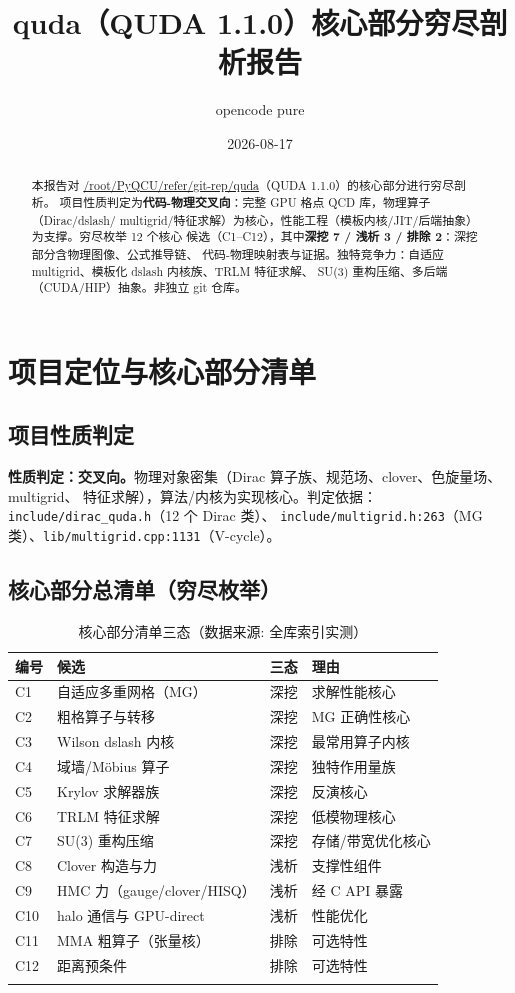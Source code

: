 \documentclass[UTF8]{ctexart}
\title{quda（QUDA 1.1.0）核心部分穷尽剖析报告}
\author{opencode pure}
\date{2026-08-17}
\begin{document}
\maketitle

\begin{abstract}
本报告对 \url{/root/PyQCU/refer/git-rep/quda}（QUDA 1.1.0）的核心部分进行穷尽剖析。
项目性质判定为\textbf{代码-物理交叉向}：完整 GPU 格点 QCD 库，物理算子（Dirac/dslash/
multigrid/特征求解）为核心，性能工程（模板内核/JIT/后端抽象）为支撑。穷尽枚举 12 个核心
候选（C1--C12），其中\textbf{深挖 7 / 浅析 3 / 排除 2}：深挖部分含物理图像、公式推导链、
代码-物理映射表与证据。独特竞争力：自适应 multigrid、模板化 dslash 内核族、TRLM 特征求解、
SU(3) 重构压缩、多后端（CUDA/HIP）抽象。非独立 git 仓库。
\end{abstract}

\tableofcontents

\section{项目定位与核心部分清单}

\subsection{项目性质判定}
\begin{keybox}
\textbf{性质判定：交叉向。}物理对象密集（Dirac 算子族、规范场、clover、色旋量场、multigrid、
特征求解），算法/内核为实现核心。判定依据：\texttt{include/dirac\_quda.h}（12 个 Dirac 类）、
\nolinkurl{include/multigrid.h:263}（MG 类）、\texttt{lib/multigrid.cpp:1131}（V-cycle）。
\end{keybox}

\subsection{核心部分总清单（穷尽枚举）}
\begin{xltabular}{\textwidth}{lXXX}
\toprule
\textcolor{map}{编号} & 候选 & 三态 & 理由 \\
\midrule
\endhead
C1 & 自适应多重网格（MG）& 深挖 & 求解性能核心 \\
C2 & 粗格算子与转移 & 深挖 & MG 正确性核心 \\
C3 & Wilson dslash 内核 & 深挖 & 最常用算子内核 \\
C4 & 域墙/Möbius 算子 & 深挖 & 独特作用量族 \\
C5 & Krylov 求解器族 & 深挖 & 反演核心 \\
C6 & TRLM 特征求解 & 深挖 & 低模物理核心 \\
C7 & SU(3) 重构压缩 & 深挖 & 存储/带宽优化核心 \\
C8 & Clover 构造与力 & 浅析 & 支撑性组件 \\
C9 & HMC 力（gauge/clover/HISQ）& 浅析 & 经 C API 暴露 \\
C10 & halo 通信与 GPU-direct & 浅析 & 性能优化 \\
C11 & MMA 粗算子（张量核）& 排除 & 可选特性 \\
C12 & 距离预条件 & 排除 & 可选特性 \\
\bottomrule
\caption{核心部分清单三态（数据来源: 全库索引实测）}
\end{xltabular}
\end{document}
